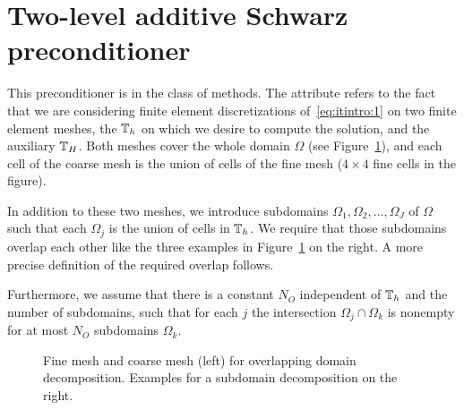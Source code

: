 \section{Two-level additive Schwarz preconditioner}

\begin{intro}
  This preconditioner is in the class of  methods. The attribute  refers
  to the fact that we are considering finite element discretizations
  of~\eqref{eq:itintro:1} on two finite element meshes, the
   $\mathbb T_h$ on which we desire to compute the
  solution, and the auxiliary  $\mathbb T_H$. Both
  meshes cover the whole domain $\Omega$ (see
  Figure~\ref{fig:schwarz:ddmeshes}), and each cell of the coarse mesh
  is the union of cells of the fine mesh ($4\times 4$ fine cells in
  the figure).

  In addition to these two meshes, we introduce subdomains
  $\Omega_1,\Omega_2,\dots,\Omega_J$ of $\Omega$ such that each
  $\Omega_j$ is the union of cells in $\mathbb T_h$. We require that those
  subdomains overlap each other like the three examples in
  Figure~\ref{fig:schwarz:ddmeshes} on the right. A more precise
  definition of the required overlap follows.

  Furthermore, we assume that there is a constant $N_O$ independent of
  $\mathbb T_h$ and the number of subdomains, such that for each $j$ the
  intersection $\Omega_j\cap\Omega_k$ is nonempty for at most $N_O$
  subdomains $\Omega_k$.
\end{intro}

\begin{figure}[tp]
  \centering
  \caption{Fine mesh and coarse mesh (left) for overlapping domain
    decomposition. Examples for a subdomain decomposition on the
    right.}
  \label{fig:schwarz:ddmeshes}
\end{figure}

